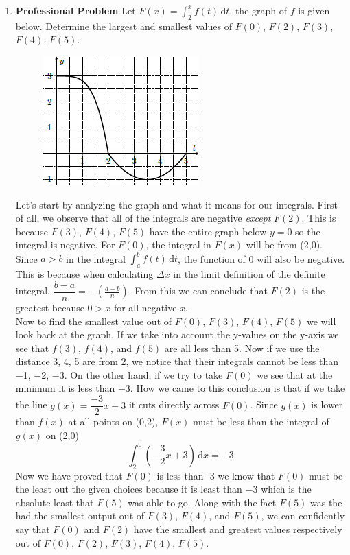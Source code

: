 \documentclass{article}
\begin{document}
\begin{enumerate}[label=\textbf{(1.\arabic*)}]
\item \textbf{Professional Problem} Let $F(x)={\displaystyle \int_2^x\!f(t)\,\text{d}t }$. the graph of $f$ is given below. Determine the largest and smallest values of $F(0)$, $F(2)$, $F(3)$, $F(4)$, $F(5)$. \\
\begin{figure}[H]
\centering
\includegraphics{firstprof}
\end{figure}

Let's start by analyzing the graph and what it means for our integrals. First of all, we observe that all of the integrals are negative \textit{except} $F(2)$. This is because $F(3)$, $F(4)$, $F(5)$ have the entire graph below $y=0$ so the integral is negative. For $F(0)$, the integral in $F(x)$ will be from (2,0). Since $a>b$ in the integral ${\displaystyle \int_a^b\!f(t)\,\text{d}t }$, the function of 0 will also be negative. This is because when calculating $\Delta x$ in the limit definition of the definite integral, $\dfrac{b-a}{n}=-\left(\frac{a-b}{n}\right)$. From this we can conclude that $F(2)$ is the greatest because $0>x$ for all negative $x$.\\
\newline
Now to find the smallest value out of $F(0)$, $F(3)$, $F(4)$, $F(5)$ we will look back at the graph. If we take into account the y-values on the y-axis we see that $f(3)$, $f(4)$, and $f(5)$ are all less than 5. Now if we use the distance 3, 4, 5 are from 2, we notice that their integrals cannot be less than $-$1, $-$2, $-$3. On the other hand, if we try to take $F(0)$ we see that at the minimum it is less than $-$3. How we came to this conclusion is that if we take the line $g(x)=\dfrac{-3}{2}x+3$ it cuts directly across $F(0)$. Since $g(x)$ is lower than $f(x)$ at all points on (0,2), $F(x)$ must be less than the integral of $g(x)$ on (2,0)
\[\int_2^0 \left(-\frac{3}{2}x+3\right)\,\text{d}x=-3\]
Now we have proved that $F(0)$ is less than -3 we know that $F(0)$ must be the least out the given choices because it is least than $-3$ which is the absolute least that $F(5)$ was able to go. Along with the fact $F(5)$ was the had the smallest output out of $F(3)$, $F(4)$, and $F(5)$, we can confidently say that $F(0)$ and $F(2)$ have the smallest and greatest values respectively out of  $F(0)$, $F(2)$, $F(3)$, $F(4)$, $F(5)$.

\end{enumerate}%
\end{document}
